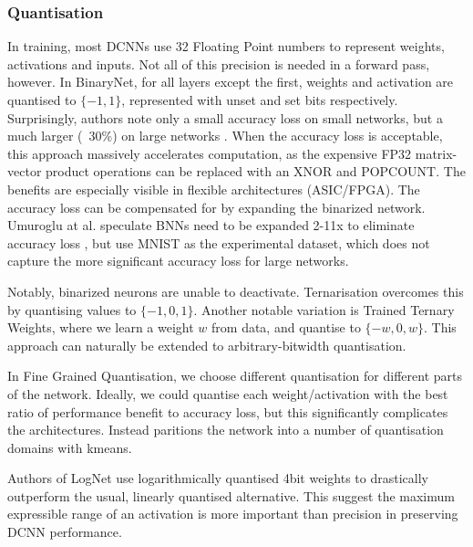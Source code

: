 \documentclass[12pt]{article}
\begin{document}
\subsubsection{Quantisation}
In training, most DCNNs use 32 Floating Point numbers to represent weights, activations and inputs.
Not all of this precision is needed in a forward pass, however.
In BinaryNet, for all layers except the first, weights and activation are quantised to $\{-1,
1\}$, represented with unset and set bits respectively.
Surprisingly, authors note only a small accuracy loss on small
networks\cite{courbariaux2016binarynet}, but a much larger (~30\%) on large networks
\cite{wang2019deep}.
When the accuracy loss is acceptable, this approach massively accelerates computation,
as the expensive FP32 matrix-vector product operations can be replaced with an XNOR and
POPCOUNT\cite{courbariaux2016binarynet}.
The benefits are especially visible in flexible architectures (ASIC/FPGA).
The accuracy loss can be compensated for by expanding the binarized network.
Umuroglu at al. speculate BNNs need to be expanded 2-11x to eliminate accuracy loss
\cite{umuroglu2016finn},
but use MNIST as the experimental dataset, which does not capture the more significant accuracy
loss for large networks.

Notably, binarized neurons are unable to deactivate. Ternarisation overcomes this by quantising
values to $\{-1, 0, 1\}$.
Another notable variation is Trained Ternary Weights, where we learn a weight $w$ from data,
and quantise to $\{-w, 0 ,w\}$.
This approach can naturally be extended to arbitrary-bitwidth quantisation.

In Fine Grained Quantisation, we choose different quantisation for different parts of the network.
Ideally, we could quantise each weight/activation with the best ratio of performance benefit
to accuracy loss,
but this significantly complicates the architectures.
Instead \cite{wu2016quantized} paritions the network into a number of quantisation domains
with kmeans.

Authors of LogNet\cite{lee2017lognet} use logarithmically quantised 4bit weights to drastically
outperform the usual, linearly quantised alternative.
This suggest the maximum expressible range of an activation is more important than precision
in preserving DCNN performance.
\end{document}

